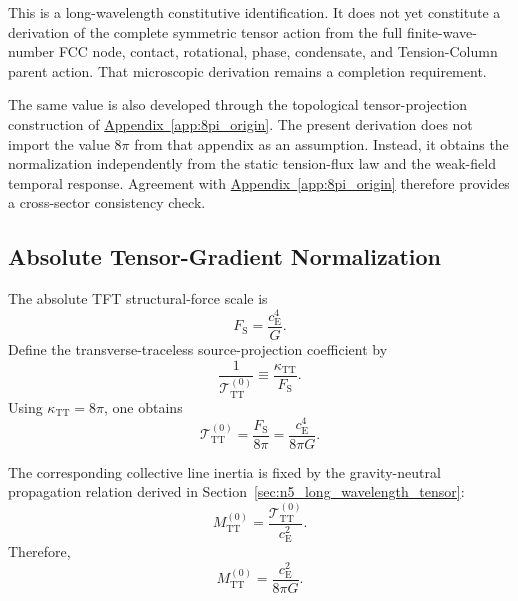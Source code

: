 This is a long-wavelength constitutive identification. It does not yet constitute a derivation of the complete symmetric tensor action from the full finite-wave-number FCC node, contact, rotational, phase, condensate, and Tension-Column parent action. That microscopic derivation remains a completion requirement.

The same value is also developed through the topological tensor-projection construction of \hyperref[app:8pi_origin]{Appendix~\ref*{app:8pi_origin}}. The present derivation does not import the value $8\pi$ from that appendix as an assumption. Instead, it obtains the normalization independently from the static tension-flux law and the weak-field temporal response. Agreement with \hyperref[app:8pi_origin]{Appendix~\ref*{app:8pi_origin}} therefore provides a cross-sector consistency check.

\subsection{Absolute Tensor-Gradient Normalization}
\label{subsec:n6_absolute_tensor_normalization}

The absolute TFT structural-force scale is
\begin{equation}
    F_{\mathrm{S}} = \frac{c_{\mathrm{E}}^{4}}{G}.
\end{equation}
Define the transverse-traceless source-projection coefficient by
\begin{equation}
    \frac{1}{\mathcal{T}_{\mathrm{TT}}^{(0)}} \equiv \frac{\kappa_{\mathrm{TT}}}{F_{\mathrm{S}}}.
    \label{eq:n6_tensor_projection_definition}
\end{equation}
Using $\kappa_{\mathrm{TT}} = 8\pi$, one obtains
\begin{equation}
    \mathcal{T}_{\mathrm{TT}}^{(0)} = \frac{F_{\mathrm{S}}}{8\pi} = \frac{c_{\mathrm{E}}^{4}}{8\pi G}.
    \label{eq:n6_TTT_normalization}
\end{equation}

The corresponding collective line inertia is fixed by the gravity-neutral propagation relation derived in Section~\ref{sec:n5_long_wavelength_tensor}:
\begin{equation}
    M_{\mathrm{TT}}^{(0)} = \frac{\mathcal{T}_{\mathrm{TT}}^{(0)}}{c_{\mathrm{E}}^{2}}.
\end{equation}
Therefore,
\begin{equation}
    M_{\mathrm{TT}}^{(0)} = \frac{c_{\mathrm{E}}^{2}}{8\pi G}.
    \label{eq:n6_MTT_normalization}
\end{equation}

